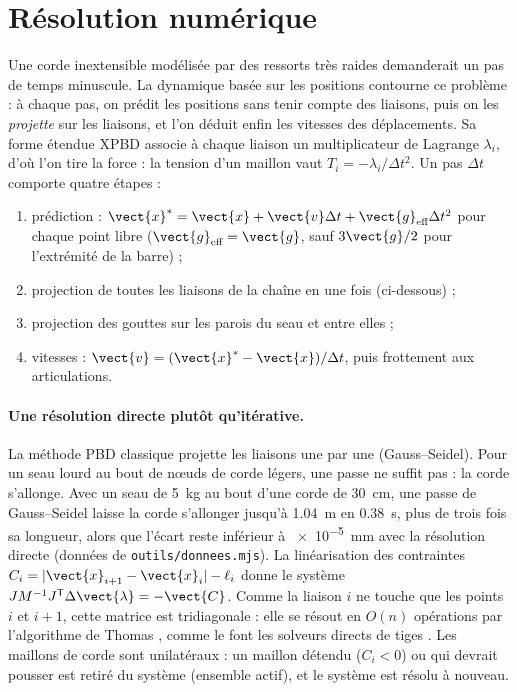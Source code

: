 
\section{Résolution numérique}

Une corde inextensible modélisée par des ressorts très raides demanderait un
pas de temps minuscule. La dynamique basée sur les positions
\cite{muller2007pbd, bender2014survey} contourne ce problème : à chaque pas, on
prédit les positions sans tenir compte des liaisons, puis on les
\emph{projette} sur les liaisons, et l'on déduit enfin les vitesses des
déplacements. Sa forme étendue XPBD \cite{macklin2016xpbd} associe à chaque
liaison un multiplicateur de Lagrange \(\lambda_i\), d'où l'on tire la force :
la tension d'un maillon vaut \(T_i = -\lambda_i / \Delta t^2\). Un pas
\(\Delta t\) comporte quatre étapes :
\begin{enumerate}
  \item prédiction : \(\vect{x}^* = \vect{x} + \vect{v} \Delta t + \vect{g}_{\text{eff}} \Delta t^2\) pour chaque point libre (\(\vect{g}_{\text{eff}} = \vect{g}\), sauf \(3\vect{g}/2\) pour l'extrémité de la barre) ;
  \item projection de toutes les liaisons de la chaîne en une fois (ci-dessous) ;
  \item projection des gouttes sur les parois du seau et entre elles ;
  \item vitesses : \(\vect{v} = (\vect{x}^* - \vect{x}) / \Delta t\), puis frottement aux articulations.
\end{enumerate}

\paragraph{Une résolution directe plutôt qu'itérative.} La méthode PBD
classique projette les liaisons une par une (Gauss--Seidel). Pour un seau
lourd au bout de nœuds de corde légers, une passe ne suffit pas : la corde
s'allonge. Avec un seau de \SI{5}{kg} au bout d'une corde de \SI{30}{cm}, une
passe de Gauss--Seidel laisse la corde s'allonger jusqu'à \SI{1,04}{m} en
\SI{0,38}{s}, plus de trois fois sa longueur, alors que l'écart reste inférieur
à \SI{e-5}{mm} avec la résolution directe (données de
\texttt{outils/donnees.mjs}). La linéarisation des
contraintes \(C_i = |\vect{x}_{i+1} - \vect{x}_i| - \ell_i\) donne le système
\(J M^{-1} J^{\mathsf{T}} \Delta\vect{\lambda} = -\vect{C}\). Comme la liaison
\(i\) ne touche que les points \(i\) et \(i+1\), cette matrice est
tridiagonale : elle se résout en \(O(n)\) opérations par l'algorithme de Thomas
\cite{press2007}, comme le font les solveurs directs de tiges
\cite{deul2018direct}. Les maillons de corde sont unilatéraux : un maillon
détendu (\(C_i < 0\)) ou qui devrait pousser est retiré du système (ensemble
actif), et le système est résolu à nouveau.


